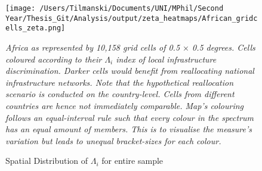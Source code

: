 \documentclass[11pt, oneside]{article}   	%
\newcommand{\mysubcaption}[1]{
\justify
\begin{spacing}{0.7}
\textit{\footnotesize #1}
\end{spacing}}
\begin{document}
\begin{figure}
\centering
\caption{Spatial Distribution of $\Lambda_{i}$ for entire sample}
\texttt{[image: /Users/Tilmanski/Documents/UNI/MPhil/Second Year/Thesis\_Git/Analysis/output/zeta\_heatmaps/African\_gridcells\_zeta.png]}

\label{fig:all_gridcells_by_zeta}
\mysubcaption{Africa as represented by 10,158 grid cells of 0.5 $\times$ 0.5 degrees. Cells coloured according to their $\Lambda_{i}$ index of local infrastructure discrimination. Darker cells would benefit from reallocating national infrastructure networks. Note that the hypothetical reallocation scenario is conducted on the country-level. Cells from different countries are hence not immediately comparable. Map's colouring follows an equal-interval rule such that every colour in the spectrum has an equal amount of members. This is to visualise the measure's variation but leads to unequal bracket-sizes for each colour.}
\end{figure}
\end{document}
